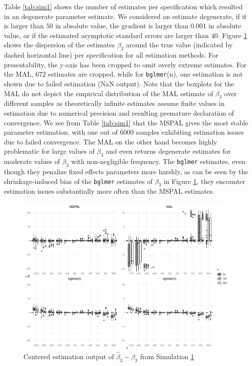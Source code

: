 \documentclass[11pt, a4paper]{article}
\theoremstyle{example} \newtheorem{example}{Example}[section]
\theoremstyle{theorem} \newtheorem{theorem}{Theorem}[section]
\theoremstyle{theorem }\newtheorem{proposition}{Proposition}[section]
\theoremstyle{theorem }\newtheorem{corollary}{Corollary}[section]
\begin{document}
Table \ref{tab:sim1} shows the number of estimates per specification which resulted in an degenerate parameter estimate. We considered an estimate degenerate, if it is larger than $50$ in absolute value, the gradient is larger than $0.001$ in absolute value, or if the estimated asymptotic standard errors are larger than $40$. Figure \ref{fig:sim1} shows the dispersion of the estimates ${\beta}_3$ around the true value (indicated by dashed horizontal line) per specification for all estimation methods. For presentability, the y-axis has been cropped to omit overly extreme estimates. For the MAL, 672 estimates are cropped, while  for \texttt{bglmer}(n), one estimation is not shown due to failed estimation (NaN output). Note that the boxplots for the MAL do not depict the empirical distribution of the MAL estimate of $\beta_3$ over different samples as theoretically infinite estimates assume finite values in estimation due to numerical precision and resulting premature declaration of convergence. We see from Table \ref{tab:sim1} that the MSPAL gives the most stable parameter estimation, with one out of 6000 samples exhibiting estimation issues due to failed convergence. The MAL on the other hand becomes highly problematic for large values of $\beta_3$ and even returns degenerate estimates for moderate values of $\beta_3$ with non-negligible frequency. The \texttt{bglmer} estimates, even though they penalize fixed effects parameters more harshly, as can be seen by the shrinkage-induced bias of the \texttt{bglmer} estimates of $\beta_3$ in Figure \ref{fig:sim1}, they encounter estimation issues substantially more often than the MSPAL estimates. 
\begin{figure}[H]
	\begin{center}
		\includegraphics[width=\textwidth]{Figures/sim1.pdf}
	\end{center}
	\caption{Centered estimation output of $\hat{\beta}_3-\beta_3$ from Simulation \hyperref[sec:sim1]{1}}
	\label{fig:sim1}
\end{figure}
\end{document}
